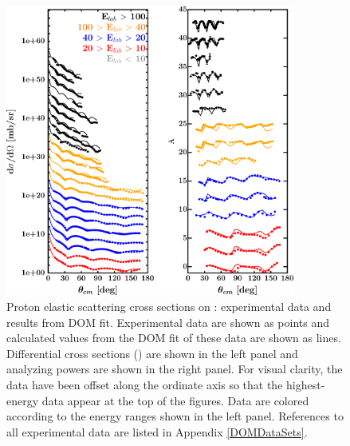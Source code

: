 \begin{figure}[tb]
    \centering
    \includegraphics[width=0.85\textwidth]{figures/ca40_protonElastic.png}
    \caption[Proton elastic scattering cross sections on \caForty: DOM predictions and experimental data]
    {
        Proton elastic scattering cross sections on \caForty: experimental data
        and results from DOM fit. Experimental data are shown as points and
        calculated values from the DOM fit of these data are shown as lines.
        Differential cross sections (\el) are shown in the left panel and
        analyzing powers are shown in the right panel. For visual clarity, the 
        data have been offset along the ordinate axis so that the highest-energy data
        appear at the top of the figures. Data are colored according to the
        energy ranges shown in the left panel. References to all experimental data are listed
        in Appendix \ref{DOMDataSets}.
    }
    \label{CaProtonElasticReproduced}
\end{figure}
